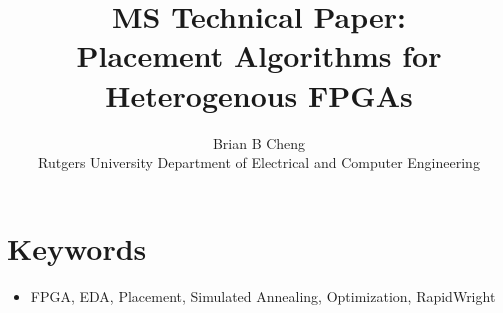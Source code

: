 \documentclass{article}
\begin{document}
\title{MS Technical Paper: \\ Placement Algorithms for Heterogenous FPGAs}
\author{Brian B Cheng \\ Rutgers University Department of Electrical and Computer Engineering}


\date{}
\maketitle

\section{Keywords}
\begin{itemize}
    \item FPGA, EDA, Placement, Simulated Annealing, Optimization, RapidWright
\end{itemize}
\end{document}
